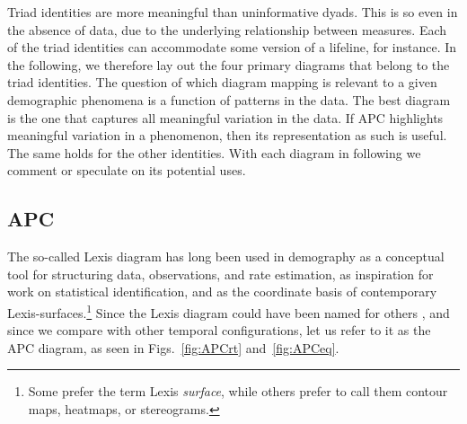 \documentclass[12pt,oneside,a4paper]{article} %
\newcommand\tgh[1]{\raisebox{-.25\height}{\texttt{[image: Figures/triadtable/triad\#1.pdf]}}}
\begin{document}
Triad identities are more meaningful than uninformative dyads. This
is so even in the absence of data, due to the underlying relationship between
measures. Each of the triad identities can accommodate some version of a
lifeline, for instance. In the following, we therefore lay out the four primary
diagrams that belong to the triad identities. The question of which diagram
mapping is relevant to a given demographic phenomena is a function of
patterns in the data. The best diagram is the one that captures all meaningful
variation in the data. If APC highlights meaningful variation in a phenomenon,
then its representation as such is useful. The same holds for the other
identities. With each diagram in following we comment or speculate on its
potential uses.

\subsection{APC}%
\FloatBarrier
The so-called Lexis diagram has long been used in demography as a conceptual
tool for structuring data, observations, and rate estimation, as inspiration for work
on statistical identification, and as the coordinate basis of contemporary
Lexis-surfaces.\footnote{Some prefer the term Lexis \textit{surface}, while
others prefer to call them contour maps, heatmaps, or stereograms.}
Since the Lexis diagram could have been named for others
\citep{keiding2011age, vandeschrick2001lexis}, and since we compare with other
temporal configurations, let us refer to it as the APC diagram, as seen in
Figs.~\ref{fig:APCrt} and~\ref{fig:APCeq}. 
\end{document}
